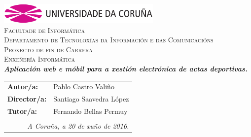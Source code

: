 \begin{titlepage}
\begin{center}
\includegraphics[width=8cm]{img/anagramaUDC.png}\\[2cm]
{\textsc{Facultade de Informática}} \\
{\large \textsc{Departamento de Tecnoloxías da Información e das Comunicacións}} 
\\[2cm]
{\Large \textsc{Proxecto de fin de Carrera}} \\
{\Large \textsc{Enxeñería Informática}} \\[2cm]
{\Large \textsl{\textbf{Aplicación web e móbil para a xestión electrónica de actas 
deportivas.}}} \\[0.15cm]
\vfill
\begin{flushright}
\begin{tabular}{ll}
\textbf{Autor/a:}    & Pablo Castro Valiño \\
\textbf{Director/a:} & Santiago Saavedra López\\
\textbf{Tutor/a:} & Fernando Bellas Permuy\\
& \\
\multicolumn{2}{r}{\small \emph{A Coruña, a 20 de xuño de 2016.}} \\
\end{tabular}
\end{flushright}
\end{center}
\end{titlepage}
